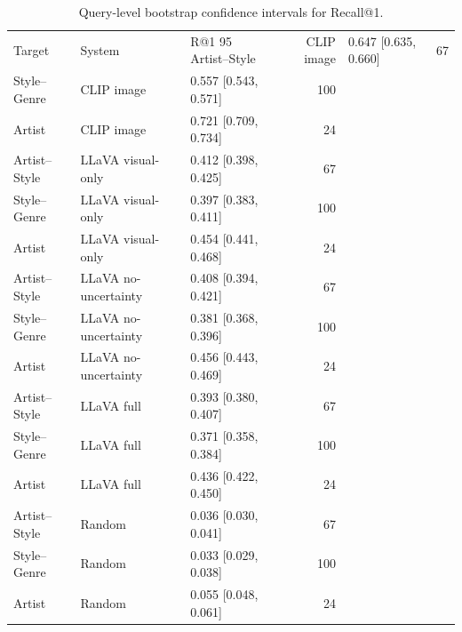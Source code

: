 \begin{table}
\caption{Query-level bootstrap confidence intervals for Recall@1.}
\label{tab:bootstrap_ci_recall1}
\begin{tabular}{lllr}
\toprule
Target & System & R@1 95%
\midrule
Artist--Style & CLIP image & 0.647 [0.635, 0.660] & 67 \\
Style--Genre & CLIP image & 0.557 [0.543, 0.571] & 100 \\
Artist & CLIP image & 0.721 [0.709, 0.734] & 24 \\
Artist--Style & LLaVA visual-only & 0.412 [0.398, 0.425] & 67 \\
Style--Genre & LLaVA visual-only & 0.397 [0.383, 0.411] & 100 \\
Artist & LLaVA visual-only & 0.454 [0.441, 0.468] & 24 \\
Artist--Style & LLaVA no-uncertainty & 0.408 [0.394, 0.421] & 67 \\
Style--Genre & LLaVA no-uncertainty & 0.381 [0.368, 0.396] & 100 \\
Artist & LLaVA no-uncertainty & 0.456 [0.443, 0.469] & 24 \\
Artist--Style & LLaVA full & 0.393 [0.380, 0.407] & 67 \\
Style--Genre & LLaVA full & 0.371 [0.358, 0.384] & 100 \\
Artist & LLaVA full & 0.436 [0.422, 0.450] & 24 \\
Artist--Style & Random & 0.036 [0.030, 0.041] & 67 \\
Style--Genre & Random & 0.033 [0.029, 0.038] & 100 \\
Artist & Random & 0.055 [0.048, 0.061] & 24 \\
\bottomrule
\end{tabular}
\end{table}

